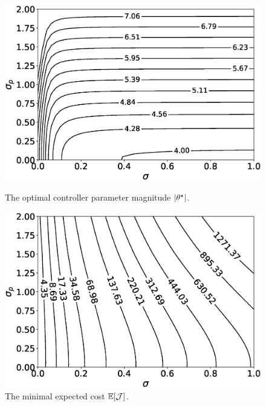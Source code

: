 \begin{figure}[tb]
  \centering
    \begin{minipage}{.48\textwidth}
        \centering
        \includegraphics[width=\linewidth]{./figures/optimal_ctrl.eps}
        \caption{The optimal controller parameter magnitude $\left|{\theta^\star}\right|$.}
        \label{fig:iwp-projections}
    \end{minipage}%
    \hfill
    \begin{minipage}{0.46\textwidth}
        \centering
        \includegraphics[width=\linewidth]{./figures/optimal_cost.eps}
        \caption{The minimal expected cost $\mathbb{E}[\mathcal{J}]$.}
        \label{fig:iwp-loss}
    \end{minipage}
  \label{fig:optimal-ctrl-cost}
\end{figure}

